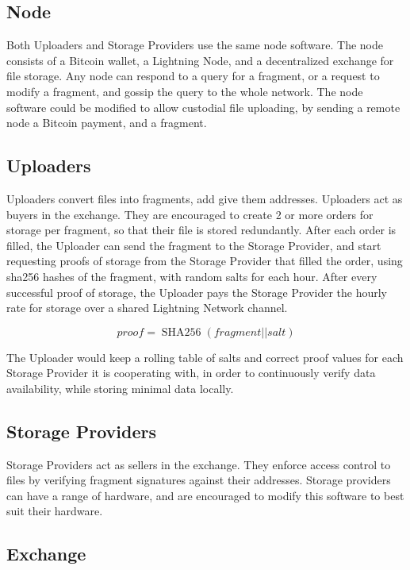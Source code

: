 \documentclass[12pt]{article}
\begin{document}
\subsection{Node}

Both Uploaders and Storage Providers use the same node software. The node consists of a Bitcoin wallet, a Lightning Node, and a decentralized exchange for file storage. Any node can respond to a query for a fragment, or a request to modify a fragment, and gossip the query to the whole network. The node software could be modified to allow custodial file uploading, by sending a remote node a Bitcoin payment, and a fragment.

\subsection{Uploaders}

Uploaders convert files into fragments, add give them addresses. Uploaders act as buyers in the exchange. They are encouraged to create 2 or more orders for storage per fragment, so that their file is stored redundantly. After each order is filled, the Uploader can send the fragment to the Storage Provider, and start requesting proofs of storage from the Storage Provider that filled the order, using sha256 hashes of the fragment, with random salts for each hour. After every successful proof of storage, the Uploader pays the Storage Provider the hourly rate for storage over a shared Lightning Network channel.

\[
    proof = \operatorname{SHA256}(fragment || salt)
\]

The Uploader would keep a rolling table of salts and correct proof values for each Storage Provider it is cooperating with, in order to continuously verify data availability, while storing minimal data locally.

\subsection{Storage Providers}

Storage Providers act as sellers in the exchange. They enforce access control to files by verifying fragment signatures against their addresses. Storage providers can have a range of hardware, and are encouraged to modify this software to best suit their hardware.

\subsection{Exchange}
\end{document}
